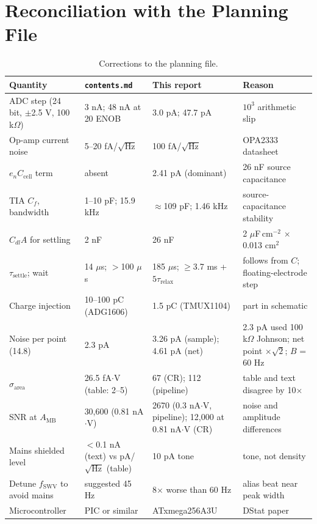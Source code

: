 \documentclass[10pt]{article}
\numberwithin{equation}{section}
\begin{document}
\section{Reconciliation with the Planning File}
\begin{table}[h]
\centering\footnotesize
\begin{tabular}{@{}p{3.0cm}p{3.5cm}p{3.9cm}p{4.7cm}@{}}
\toprule
Quantity & \texttt{contents.md} & This report & Reason \\
\midrule
ADC step (24 bit, $\pm$2.5 V, 100 k$\Omega$) & 3 nA; 48 nA at 20 ENOB & 3.0 pA; 47.7 pA & $10^3$ arithmetic slip \\
Op-amp current noise & 5--20 fA/$\sqrt{\text{Hz}}$ & 100 fA/$\sqrt{\text{Hz}}$ & OPA2333 datasheet \\
$e_n C_{\text{cell}}$ term & absent & 2.41 pA (dominant) & 26 nF source capacitance \\
TIA $C_f$, bandwidth & 1--10 pF; 15.9 kHz & $\approx$109 pF; 1.46 kHz & source-capacitance stability \\
$C_{dl}A$ for settling & 2 nF & 26 nF & 2 $\mu$F\,cm$^{-2}$ $\times$ 0.013 cm$^2$ \\
$\tau_{\text{settle}}$; wait & 14 $\mu$s; $>$100 $\mu$s & 185 $\mu$s; $\ge$3.7 ms + $5\tau_{\text{relax}}$ & follows from $C$; floating-electrode step \\
Charge injection & 10--100 pC (ADG1606) & 1.5 pC (TMUX1104) & part in schematic \\
Noise per point (14.8) & 2.3 pA & 3.26 pA (sample); 4.61 pA (net) & 2.3 pA used 100 k$\Omega$ Johnson; net point $\times\sqrt2$; $B$ = 60 Hz \\
$\sigma_{\text{area}}$ & 26.5 fA$\cdot$V (table: 2--5) & 67 (CR); 112 (pipeline) & table and text disagree by 10$\times$ \\
SNR at $A_{\text{MB}}$ & 30,600 (0.81 nA$\cdot$V) & 2670 (0.3 nA$\cdot$V, pipeline); 12,000 at 0.81 nA$\cdot$V (CR) & noise and amplitude differences \\
Mains shielded level & $<$0.1 nA (text) vs pA/$\sqrt{\text{Hz}}$ (table) & 10 pA tone & tone, not density \\
Detune $f_{\text{SWV}}$ to avoid mains & suggested 45 Hz & 8$\times$ worse than 60 Hz & alias beat near peak width \\
Microcontroller & PIC or similar & ATxmega256A3U & DStat paper \\
\bottomrule
\end{tabular}
\caption{Corrections to the planning file.}\label{tab:recon}
\end{table}
\end{document}

